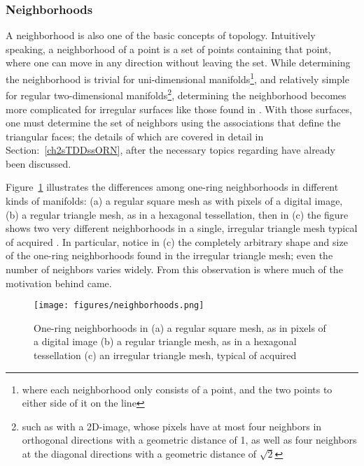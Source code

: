 %
%
\subsubsection{Neighborhoods}
\label{ch2sETBssTsssN}
A neighborhood is also one of the basic concepts of topology. Intuitively speaking, a neighborhood of a point is a set of points containing that point, where one can move in any direction without leaving the set. While determining the neighborhood is trivial for uni-dimensional manifolds\footnote{where each neighborhood only consists of a point, and the two points to either side of it on the line}, and relatively simple for regular two-dimensional manifolds\footnote{such as with a 2D-image, whose pixels have at most four neighbors in orthogonal directions with a geometric distance of 1, as well as four neighbors at the diagonal directions with a geometric distance of $\sqrt{2}$}, determining the neighborhood becomes more complicated for irregular surfaces like those found in \tdd{}. With those surfaces, one must determine the set of neighbors using the associations that define the triangular faces; the details of which are covered in detail in Section:~\ref{ch2sTDDssORN}, after the necessary topics regarding \tdd{} have already been discussed.

Figure~\ref{fig:neighborhoods} illustrates the differences among one-ring neighborhoods in different kinds of manifolds: (a) a regular square mesh as with pixels of a digital image, (b) a regular triangle mesh, as in a hexagonal tessellation, then in (c) the figure shows two very different neighborhoods in a single, irregular triangle mesh typical of acquired \tdd{}. In particular, notice in (c) the completely arbitrary shape and size of the one-ring neighborhoods found in the irregular triangle mesh; even the number of neighbors varies widely. From this observation is where much of the motivation behind  came.

\begin{figure}[ht]
\ffigbox
	{\texttt{[image: figures/neighborhoods.png]}}
	{\caption[One-ring neighborhoods in regular and irregular meshes]{One-ring neighborhoods in (a) a regular square mesh, as in pixels of a digital image (b) a regular triangle mesh, as in a hexagonal tessellation (c) an irregular triangle mesh, typical of acquired \tdd{}}\label{fig:neighborhoods}}
\end{figure}

%
%
%
%
%
%
